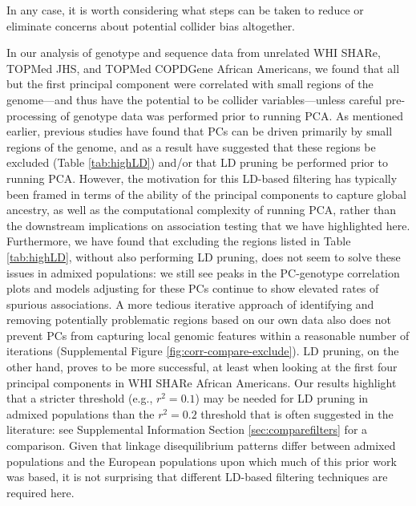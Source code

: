 \documentclass[12pt]{article}
\newcommand{\add}[1]{{\color{red}{[... #1 ...]}}}
\begin{document}
In any case, it is worth considering what steps can be taken to reduce or eliminate concerns about potential collider bias altogether.

In our analysis of genotype and sequence data from unrelated WHI SHARe, TOPMed JHS, and TOPMed COPDGene African Americans, we found that all but the first principal component were  correlated with small regions of the genome---and thus have the potential to be collider variables---unless careful pre-processing of genotype data was performed prior to running PCA.
As mentioned earlier, previous studies have found that PCs can be driven primarily by small regions of the genome, and as a result have suggested that these regions be excluded (Table \ref{tab:highLD}) and/or that LD pruning be performed prior to running PCA.
However, the motivation for this LD-based filtering has typically been framed in terms of the ability of the principal components to capture global ancestry, as well as the computational complexity of running PCA, rather than the downstream implications on association testing that we have highlighted here.
Furthermore, we have found that excluding the regions listed in Table \ref{tab:highLD}, without also performing LD pruning, does not seem to solve these issues in admixed populations: we still see peaks in the PC-genotype correlation plots and models adjusting for these PCs continue to show elevated rates of spurious associations.
A more tedious iterative approach of identifying  and removing potentially problematic regions based on our own data also does not prevent PCs from capturing local genomic features within a reasonable number of iterations (Supplemental Figure \ref{fig:corr-compare-exclude}).
LD pruning, on the other hand, proves to be more successful, at least when looking at the first four principal components in WHI SHARe African Americans.
Our results highlight that a stricter threshold (e.g., $r^2 = 0.1$) may be needed for LD pruning in admixed populations than the $r^2 = 0.2$ threshold that is often suggested in the literature: see Supplemental Information Section \ref{sec:comparefilters} for a comparison.
Given that linkage disequilibrium patterns differ between admixed populations and the European populations upon which much of this prior work was based, %
it is not surprising that different LD-based filtering techniques are required here.
\end{document}
